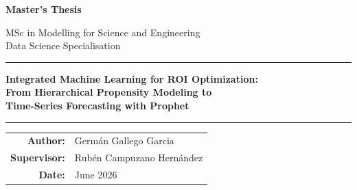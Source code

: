 \begin{titlepage}
  \centering
  \vspace*{2cm}

  {\LARGE \textbf{Master's Thesis}\par}
  \vspace{0.5cm}
  {\large MSc in Modelling for Science and Engineering\\
  Data Science Specialisation\par}
  \vspace{2cm}

  \rule{\linewidth}{0.5mm}
  \vspace{0.4cm}
  {\huge \bfseries Integrated Machine Learning for ROI Optimization:\\
  From Hierarchical Propensity Modeling to\\
  Time-Series Forecasting with Prophet\par}
  \vspace{0.4cm}
  \rule{\linewidth}{0.5mm}

  \vspace{2cm}

  \begin{tabular}{rl}
    \textbf{Author:}     & Germán Gallego Garcia \\[0.4em]
    \textbf{Supervisor:} & Rubén Campuzano Hernández \\[0.4em]
    \textbf{Date:}       & June 2026 \\
  \end{tabular}

  \vfill

\end{titlepage}

